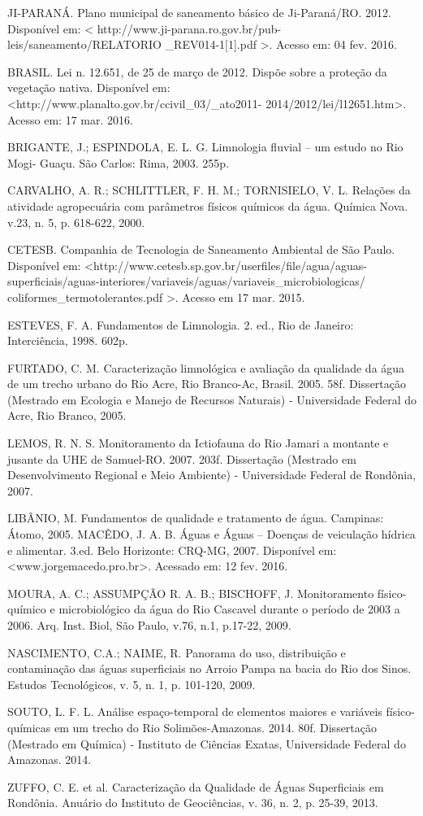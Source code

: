 \documentclass[article,12pt,onesidea,4paper,english,brazil]{abntex2}
\begin{document}
JI-PARANÁ. Plano municipal de saneamento básico de Ji-Paraná/RO. 2012.
Disponível em: < http://www.ji-parana.ro.gov.br/pub-leis/saneamento/RELATORIO
\_REV014-1[1].pdf >. Acesso em: 04 fev. 2016.

BRASIL. Lei n. 12.651, de 25 de março de 2012. Dispõe sobre a proteção da vegetação nativa. Disponível em: <http://www.planalto.gov.br/ccivil\_03/\_ato2011- 2014/2012/lei/l12651.htm>. Acesso em: 17 mar. 2016.

BRIGANTE, J.; ESPINDOLA, E. L. G. Limnologia fluvial – um estudo no Rio Mogi- Guaçu. São Carlos: Rima, 2003. 255p.

CARVALHO, A. R.; SCHLITTLER, F. H. M.; TORNISIELO, V. L. Relações da
atividade agropecuária com parâmetros físicos químicos da água. Química Nova. v.23, n. 5, p. 618-622, 2000.

CETESB. Companhia de Tecnologia de Saneamento Ambiental de São Paulo. Disponível em: <http://www.cetesb.sp.gov.br/userfiles/file/agua/aguas- superficiais/aguas-interiores/variaveis/aguas/variaveis\_microbiologicas/ coliformes\_termotolerantes.pdf >. Acesso em 17 mar. 2015.

ESTEVES, F. A. Fundamentos de Limnologia. 2. ed., Rio de Janeiro: Interciência, 1998. 602p.

FURTADO, C. M. Caracterização limnológica e avaliação da qualidade da água de um trecho urbano do Rio Acre, Rio Branco-Ac, Brasil. 2005. 58f. Dissertação (Mestrado em Ecologia e Manejo de Recursos Naturais) - Universidade Federal do Acre, Rio Branco, 2005.

LEMOS, R. N. S. Monitoramento da Ictiofauna do Rio Jamari a montante e jusante da UHE de Samuel-RO. 2007. 203f. Dissertação (Mestrado em Desenvolvimento Regional e Meio Ambiente) - Universidade Federal de Rondônia, 2007.

LIBÂNIO, M. Fundamentos de qualidade e tratamento de água. Campinas: Átomo, 2005.
MACÊDO, J. A. B. Águas e Águas – Doenças de veiculação hídrica e alimentar. 3.ed. Belo Horizonte: CRQ-MG, 2007. Disponível em: <www.jorgemacedo.pro.br>. Acessado em: 12 fev. 2016.

MOURA, A. C.; ASSUMPÇÃO R. A. B.; BISCHOFF, J. Monitoramento físico-químico e microbiológico da água do Rio Cascavel durante o período de 2003 a 2006. Arq.
Inst. Biol, São Paulo, v.76, n.1, p.17-22, 2009.

NASCIMENTO, C.A.; NAIME, R. Panorama do uso, distribuição e contaminação das águas superficiais no Arroio Pampa na bacia do Rio dos Sinos. Estudos Tecnológicos, v. 5, n. 1, p. 101-120, 2009.

SOUTO, L. F. L. Análise espaço-temporal de elementos maiores e variáveis físico-químicas em um trecho do Rio Solimões-Amazonas. 2014. 80f.
Dissertação (Mestrado em Química) - Instituto de Ciências Exatas, Universidade Federal do Amazonas. 2014.

ZUFFO, C. E. et al. Caracterização da Qualidade de Águas Superficiais em Rondônia. Anuário do Instituto de Geociências, v. 36, n. 2, p. 25-39, 2013.
	
\end{document}
